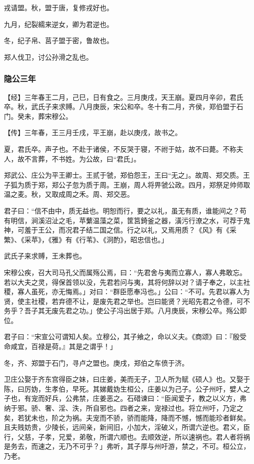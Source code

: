 \documentclass[]{article}
\begin{document}
戎请盟。秋，盟于唐，复修戎好也。

九月，纪裂繻来逆女，卿为君逆也。

冬，纪子帛、莒子盟于密，鲁故也。

郑人伐卫，讨公孙滑之乱也。

\hypertarget{header-n40}{%
\subsubsection{隐公三年}\label{header-n40}}

【经】三年春王二月，己巳，日有食之。三月庚戌，天王崩。夏四月辛卯，君氏卒。秋，武氏子来求赙。八月庚辰，宋公和卒。冬十有二月，齐侯，郑伯盟于石门。癸未，葬宋穆公。

【传】三年春，王三月壬戌，平王崩，赴以庚戌，故书之。

夏，君氏卒。声子也。不赴于诸侯，不反哭于寝，不祔于姑，故不曰薨。不称夫人，故不言葬，不书姓。为公故，曰``君氏」。

郑武公、庄公为平王卿士。王贰于虢，郑伯怨王，王曰``无之」。故周、郑交质。王子狐为质于郑，郑公子忽为质于周。王崩，周人将畀虢公政。四月，郑祭足帅师取温之麦。秋，又取成周之禾。周、郑交恶。

君子曰：``信不由中，质无益也。明恕而行，要之以礼，虽无有质，谁能间之？苟有明信，涧溪沼沚之毛，苹蘩温藻之菜，筐筥錡釜之器，潢污行潦之水，可荐于鬼神，可羞于王公，而况君子结二国之信。行之以礼，又焉用质？《风》有《采繁》、《采苹》，《雅》有《行苇》、《泂酌》，昭忠信也。」

武氏子来求赙，王未葬也。

宋穆公疾，召大司马孔父而属殇公焉，曰：``先君舍与夷而立寡人，寡人弗敢忘。若以大夫之灵，得保首领以没，先君若问与夷，其将何辞以对？请子奉之，以主社稷，寡人虽死，亦无悔焉。」对曰：``群臣愿奉冯也。」公曰：``不可。先君以寡人为贤，使主社稷，若弃德不让，是废先君之举也。岂曰能贤？光昭先君之令德，可不务乎？吾子其无废先君之功。」使公子冯出居于郑。八月庚辰，宋穆公卒。殇公即位。

君子曰：``宋宣公可谓知人矣。立穆公，其子飨之，命以义夫。《商颂》曰：『殷受命咸宜，百禄是荷。』其是之谓乎！」

冬，齐、郑盟于石门，寻卢之盟也。庚戌，郑伯之车偾于济。

卫庄公娶于齐东宫得臣之妹，曰庄姜，美而无子，卫人所为赋《硕人》也。又娶于陈，曰厉妫，生孝伯，早死。其娣戴妫生桓公，庄姜以为己子。公子州吁，嬖人之子也，有宠而好兵，公弗禁，庄姜恶之。石碏谏曰：``臣闻爱子，教之以义方，弗纳于邪。骄、奢、淫、泆，所自邪也。四者之来，宠禄过也。将立州吁，乃定之矣，若犹未也，阶之为祸。夫宠而不骄，骄而能降，降而不憾，憾而能珍者鲜矣。且夫贱妨贵，少陵长，远间亲，新间旧，小加大，淫破义，所谓六逆也。君义，臣行，父慈，子孝，兄爱，弟敬，所谓六顺也。去顺效逆，所以速祸也。君人者将祸是务去，而速之，无乃不可乎？」弗听，其子厚与州吁游，禁之，不可。桓公立，乃老。
\end{document}
